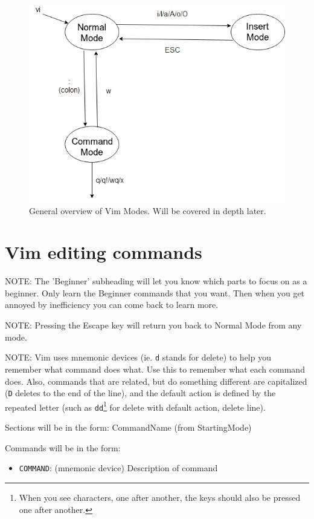 \documentclass[11pt]{article}
\begin{document}
\begin{figure}[htbp]
\centering
\includegraphics[width=.9\linewidth]{./modes.jpg}
\caption{\label{fig:orgece1b37}
General overview of Vim Modes. Will be covered in depth later.}
\end{figure}
\section{Vim editing commands}
\label{sec:org8dbebb1}
NOTE: The 'Beginner' subheading will let you know which parts to focus on as a
beginner. Only learn the Beginner commands that you want. Then when you get
annoyed by inefficiency you can come back to learn more.

NOTE: Pressing the Escape key will return you back to Normal Mode from any mode.

NOTE: Vim uses mnemonic devices (ie. \texttt{d} stands for delete) to help you remember
what command does what. Use this to remember what each command does. Also,
commands that are related, but do something different are capitalized (\texttt{D}
deletes to the end of the line), and the default action is defined by the
repeated letter (such as \texttt{dd}\footnote{When you see characters, one after another, the keys should also be pressed
one after another.} for delete with default action, delete line).

Sections will be in the form: CommandName (from StartingMode)

Commands will be in the form:
\begin{itemize}
\item \texttt{COMMAND}: (mnemonic device) Description of command
\end{itemize}
\end{document}
